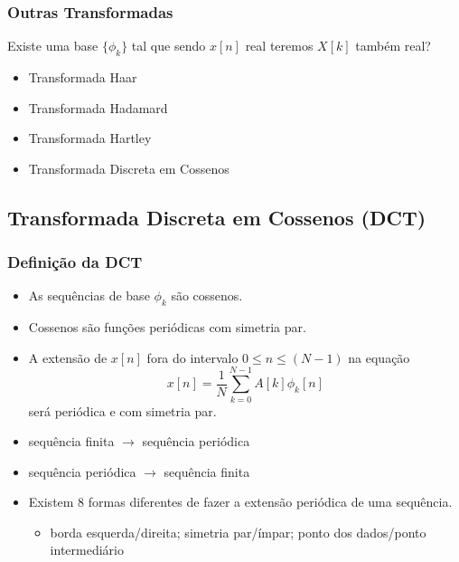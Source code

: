 \begin{frame}%
  \frametitle{Outras Transformadas}
  Existe uma base $\{ \phi_k \}$ tal que sendo $x[n]$ real teremos $X[k]$ também real?

  \vspace{0.5cm}
  \begin{itemize}
  \item Transformada Haar
  \item Transformada Hadamard
  \item Transformada Hartley
  \item Transformada Discreta em Cossenos
  \end{itemize}
\end{frame}


\subsection{Transformada Discreta em Cossenos (DCT)}
\begin{frame}%
  \frametitle{Definição da DCT}
  \begin{itemize}
  \item As sequências de base $\phi_k$ são cossenos.
  \item Cossenos são funções periódicas com simetria par.
  \item A extensão de $x[n]$ fora do intervalo $0 \leq n \leq (N-1)$ na equação
          \begin{equation}
          x[n] = \frac{1}{N} \sum_{k=0}^{N-1} A[k] \phi_k[n]
          \end{equation}
        será periódica e com simetria par.
  \item sequência finita $\rightarrow$ sequência periódica
  \item sequência periódica $\rightarrow$ sequência finita
  \item Existem 8 formas diferentes de fazer a extensão periódica de uma sequência.
        \begin{itemize}
        \item borda esquerda/direita; simetria par/ímpar; ponto dos dados/ponto intermediário
        \end{itemize}
  \end{itemize}
\end{frame}

